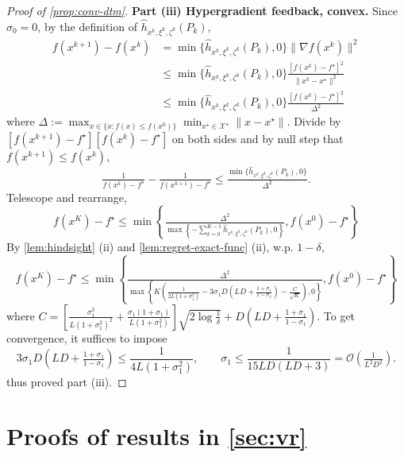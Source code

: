 \documentclass{article}
\theoremstyle{definition}
\newcommand{\assign}{:=}
\begin{document}
\begin{proof}[Proof of \cref{prop:conv-dtm}]
  \textbf{Part (iii) Hypergradient feedback, convex.} Since $\sigma_0 = 0$, by the definition of
  $\hat{h}_{x^k, \xi^k, \zeta^k} (P_k)$,
  \begin{align*}
    f (x^{k + 1}) - f (x^k) &{}= \min \{ \hat{h}_{x^k, \xi^k, \zeta^k} (P_k),
    0 \} \| \nabla f (x^k) \|^2\\
    &{}\leq \min \{ \hat{h}_{x^k, \xi^k, \zeta^k} (P_k), 0 \} \tfrac{[f
    (x^k) - f^{\star}]^2}{\| x^k - x^{\star} \|^2}\\
    &{}\leq \min \{ \hat{h}_{x^k, \xi^k, \zeta^k} (P_k), 0 \} \tfrac{[f
    (x^k) - f^{\star}]^2}{\Delta^2}
  \end{align*}
  where $\Delta \assign \max_{x \in \{ x : f (x) \leq f (x^0) \}}
  \min_{x^{\star} \in \mathcal{X}^{\star}} \| x - x^{\star} \|$. Divide by $[f
  (x^{k + 1}) - f^{\star}] [f (x^k) - f^{\star}]$ on both sides and by null
  step that $f (x^{k + 1}) \leq f (x^k)$,
  \[ \tfrac{1}{f (x^k) - f^{\star}} - \tfrac{1}{f (x^{k + 1}) - f^{\star}}
     \leq \tfrac{\min \{ \hat{h}_{x^k, \xi^k, \zeta^k} (P_k), 0 \}}{\Delta^2}
     . \]
  Telescope and rearrange,
  \[ f (x^{K}) - f^{\star} \leq \min \left\{ \tfrac{\Delta^2}{\max \left\{
     - \textstyle \sum_{k = 0}^{K - 1} \hat{h}_{x^k, \xi^k, \zeta^k} (P_k), 0
     \right\}}, f (x^0) - f^{\star} \right\} \]
  By \cref{lem:hindsight} (ii) and \cref{lem:regret-exact-func} (ii), w.p. $1 -
  \delta$,
  \[ f (x^{K}) - f^{\star} \leq \min \left\{ \tfrac{\Delta^2}{\max \left\{
     K \left( \frac{1}{2 L (1 + \sigma_1^2)} - 3 \sigma_1 D \left( L D +
     \tfrac{1 + \sigma_1}{1 - \sigma_1} \right) - \tfrac{C}{\sqrt{K}} \right),
     0 \right\}}, f (x^0) - f^{\star} \right\} \]
  where $C = \left[ \tfrac{\sigma_1^3}{L (1 + \sigma_1^2)^2} + \tfrac{\sigma_1
  (1 + \sigma_1)}{L (1 + \sigma_1^2)} \right] \sqrt{2 \log \tfrac{1}{\delta}}
  + D \left( L D + \tfrac{1 + \sigma_1}{1 - \sigma_1} \right)$. To get
  convergence, it suffices to impose
  \[
    3 \sigma_1 D \left( L D + \tfrac{1 + \sigma_1}{1 - \sigma_1} \right)
    \leq \frac{1}{4 L (1 + \sigma_1^2)}, \qquad
    \sigma_1 \leq \frac{1}{15 L D (L D + 3)}
    = \mathcal{O} \left( \tfrac{1}{L^2 D^2} \right).
  \]
  thus proved part (iii).
\end{proof}


\section{Proofs of results in \cref{sec:vr}}
\end{document}
